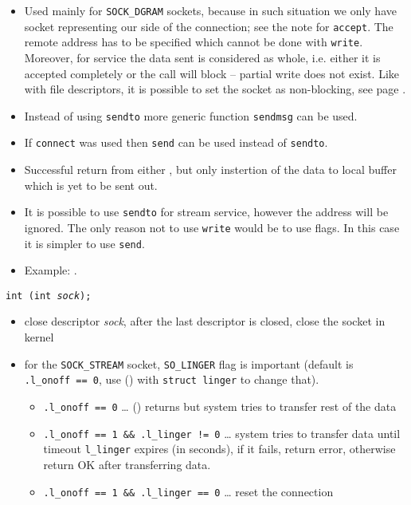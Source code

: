 \begin{itemize}
\item Used mainly for \texttt{SOCK\_DGRAM} sockets, because in such situation
we only have socket representing our side of the connection; see the note
for \texttt{accept}. The remote address has to be specified which cannot be
done with \texttt{write}. Moreover, for  service the data sent
is considered as whole, i.e. either it is accepted completely or the call
will block -- partial write does not exist. Like with file descriptors, it is
possible to set the socket as non-blocking, see page \pageref{FCNTL}.
\item Instead of using \texttt{sendto} more generic function \texttt{sendmsg}
can be used.
\item If \texttt{connect} was used then \texttt{send} can be used instead of
\texttt{sendto}.
\item Successful return from either , but only instertion of the data to local buffer
which is yet to be sent out.
\item It is possible to use \texttt{sendto} for stream service, however the
address will be ignored. The only reason not to use \texttt{write} would be to
use flags. In this case it is simpler to use \texttt{send}.
\item Example:\label{UDP_CLIENT_C} .
\end{itemize}



\begin{slide}
\setlength{\baselineskip}{0.8\baselineskip}
\texttt{int (int \emph{sock});}
\begin{itemize}
\item close descriptor \emph{sock}, after the last descriptor is closed, close
the socket in kernel
\item for the \texttt{SOCK\_STREAM} socket,
\texttt{SO\_LINGER} flag is important (default is \texttt{.l\_onoff~==~0}, use
() with \texttt{struct linger} to change that).
    \begin{itemize}
    \item \texttt{.l\_onoff~==~0} \dots{} () returns but system
    tries to transfer rest of the data
    \item \texttt{.l\_onoff~==~1~\&\&~.l\_linger~!=~0} \dots{} system tries to
    transfer data until timeout \texttt{l\_linger} expires (in seconds), if it
    fails, return error, otherwise return OK after transferring data.
    \item \texttt{.l\_onoff~==~1~\&\&~.l\_linger~==~0} \dots{} reset the
    connection
    \end{itemize}
\end{itemize}
\end{slide}

